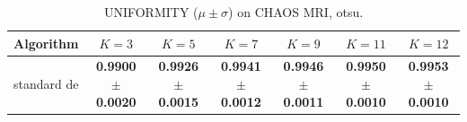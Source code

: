 \begin{table}[htbp]
\centering
\caption{UNIFORMITY ($\mu \pm \sigma$) on CHAOS MRI, otsu.}
\label{tab:exp2-otsu-uniformity}
\begin{tabular}{lcccccc}
\toprule
Algorithm & $K=3$ & $K=5$ & $K=7$ & $K=9$ & $K=11$ & $K=12$ \\
\midrule
standard de & \textbf{0.9900 $\pm$ 0.0020} & \textbf{0.9926 $\pm$ 0.0015} & \textbf{0.9941 $\pm$ 0.0012} & \textbf{0.9946 $\pm$ 0.0011} & \textbf{0.9950 $\pm$ 0.0010} & \textbf{0.9953 $\pm$ 0.0010} \\
\bottomrule
\end{tabular}
\end{table}